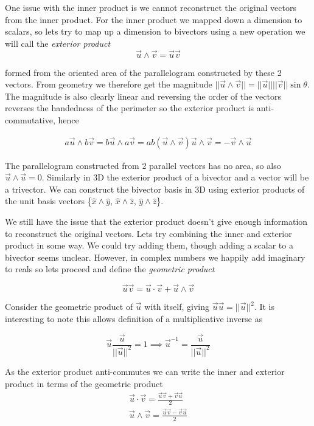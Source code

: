 \documentclass[options]{report}
\def \u{\vec{u}}
\def \v{\vec{v}}
\def \xhat{\hat{x}}
\def \yhat{\hat{y}}
\def \zhat{\hat{z}}
\begin{document}
One issue with the inner product is we cannot reconstruct the original vectors from the inner product. For the inner product we mapped down a dimension to scalars, so lets try to map up a dimension to bivectors using a new operation we will call the \textit{exterior product}
\begin{equation}
	\u \wedge \v = \u\v
\end{equation}

formed from the oriented area of the parallelogram constructed by these 2 vectors. From geometry we therefore get the magnitude $||\u \wedge \v|| = ||\u|| ||\v|| \sin \theta$. The magnitude is also clearly linear and reversing the order of the vectors reverses the handedness of the perimeter so the exterior product is anti-commutative, hence

\begin{equation}
	\begin{gathered}
		a\u \wedge b\v = b\u \wedge a\v = ab(\u \wedge \v)
		\u \wedge \v = - \v \wedge \u
	\end{gathered}
\end{equation}

The parallelogram constructed from 2 parallel vectors has no area, so also $\u \wedge \u = 0$. Similarly in 3D the exterior product of a bivector and a vector will be a trivector. We can construct the bivector basis in 3D using exterior products of the unit basis vectors \{$\xhat \wedge \yhat$, $\xhat \wedge \zhat$, $\yhat \wedge \zhat$\}. 

We still have the issue that the exterior product doesn't give enough information to reconstruct the original vectors. Lets try combining the inner and exterior product in some way. We could try adding them, though adding a scalar to a bivector seems unclear. However, in complex numbers we happily add imaginary to reals so lets proceed and define the \textit{geometric product}

\begin{equation}
	\u\v = \u \cdot \v + \u \wedge \v
\end{equation}

Consider the geometric product of $\u$ with itself, giving $\u\u = ||\u||^2$. It is interesting to note this allows definition of a multiplicative inverse as

\begin{equation}
	\u \frac{\u}{||\u||^2} = 1 \implies \u^{-1} = \frac{\u}{||\u||^2}
\end{equation}

As the exterior product anti-commutes we can write the inner and exterior product in terms of the geometric product
\begin{equation}
	\begin{gathered}
		\u \cdot \v = \frac{\u\v + \v\u}{2} \\
		\u \wedge \v = \frac{\u\v - \v\u}{2}
	\end{gathered}
\end{equation}
\end{document}
